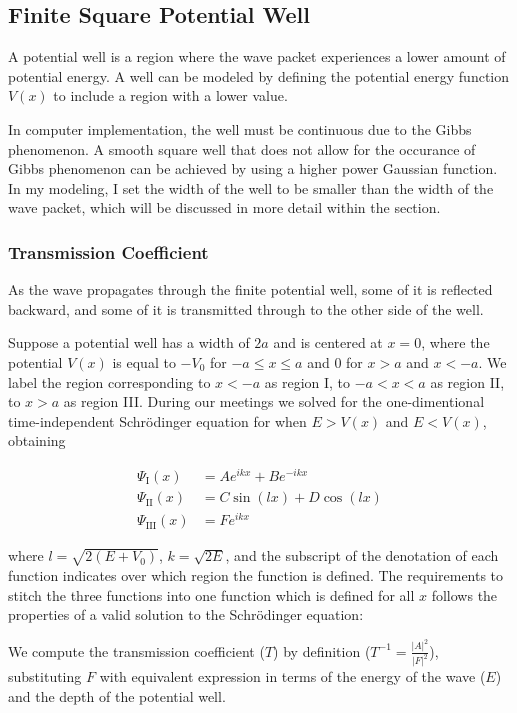 \subsection*{Finite Square Potential Well}
A potential well is a region where the wave packet experiences a lower
amount of potential energy. A well can be modeled by defining the potential
energy function $V(x)$ to include a region with a lower value.

In computer implementation, the well must be continuous due to the Gibbs
phenomenon. A smooth square well that does not allow for the occurance of
Gibbs phenomenon can be achieved by using a higher power Gaussian function.
In my modeling, I set the width of the well to be smaller than the width of
the wave packet, which will be discussed in more detail within the
 section.

\subsubsection*{Transmission Coefficient}
As the wave propagates through the finite potential well, some of it is
reflected backward, and some of it is transmitted through to the other side
of the well.

Suppose a potential well has a width of $2a$ and is centered at $x = 0$,
where the potential $V(x)$ is equal to $-V_0$ for $-a \leq x \leq a$ and $0$
for $x > a$ and $x < -a$. We label the region corresponding to $x < -a$ as
region I, to $-a < x < a$ as region II, to $x > a$ as region III. During our
meetings we solved for the one-dimentional time-independent Schrödinger
equation for when $E > V(x)$ and $E < V(x)$, obtaining

\begin{align*}
    \Psi_\mathrm{I}(x) &= Ae^{ikx} + Be^{-ikx} \\
    \Psi_{\mathrm{II}}(x) &= C\sin(lx) + D\cos(lx) \\
    \Psi_{\mathrm{III}}(x) &= Fe^{ikx}
\end{align*}

where $l = \sqrt{2(E + V_0)}$, $k = \sqrt{2E}$, and the subscript of the
denotation of each function indicates over which region the function is
defined. The requirements to stitch the three functions into one function
which is defined for all $x$ follows the properties of a valid solution to
the Schrödinger equation:

We compute the transmission coefficient ($T$) by definition ($T^{-1} =
\frac{\left| A \right| ^{2}}{\left| F \right| ^{2}}$), substituting $F$ with
equivalent expression in terms of the energy of the wave ($E$) and the depth
of the potential well.

